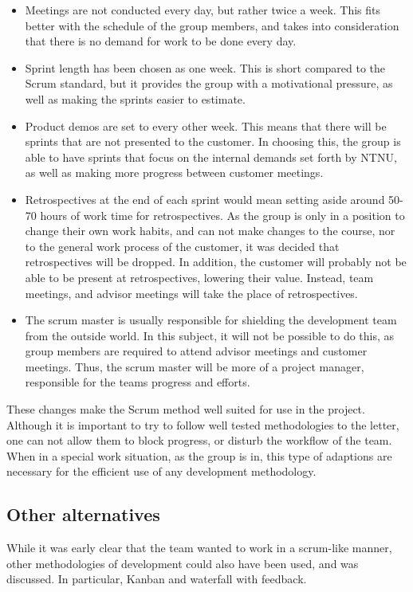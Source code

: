 \documentclass[11pt,a4paper,titlepage,oneside]{report}
\begin{document}
\begin{itemize}
\item Meetings are not conducted every day, but rather twice a week. This fits better with the schedule of the group members, and takes into consideration that there is no demand for work to be done every day. 
\item Sprint length has been chosen as one week. This is short compared to the Scrum standard, but it provides the group with a motivational pressure, as well as making the sprints easier to estimate. 
\item Product demos are set to every other week. This means that there will be sprints that are not presented to the customer. In choosing this, the group is able to have sprints that focus on the internal demands set forth by \gls{NTNU}, as well as making more progress between customer meetings.
\item Retrospectives at the end of each sprint would mean setting aside around 50-70 hours of work time for retrospectives. As the group is only in a position to change their own work habits, and can not make changes to the course, nor to the general work process of the customer, it was decided that retrospectives will be dropped. In addition, the customer will probably not be able to be present at retrospectives, lowering their value. Instead, team meetings, and advisor meetings will take the place of retrospectives. 
\item The scrum master is usually responsible for shielding the development team from the outside world. In this subject, it will not be possible to do this, as group members are required to attend advisor meetings and customer meetings. Thus, the scrum master will be more of a project manager, responsible for the teams progress and efforts. 
\end {itemize}

These changes make the Scrum method well suited for use in the project. Although it is important to try to follow well tested methodologies to the letter, one can not allow them to block progress, or disturb the workflow of the team. When in a special work situation, as the group is in, this type of adaptions are necessary for the efficient use of any development methodology. 

\subsection{Other alternatives}
While it was early clear that the team wanted to work in a scrum-like manner, other methodologies of development could also have been used, and was discussed. In particular, Kanban and waterfall with feedback.
\end{document}
